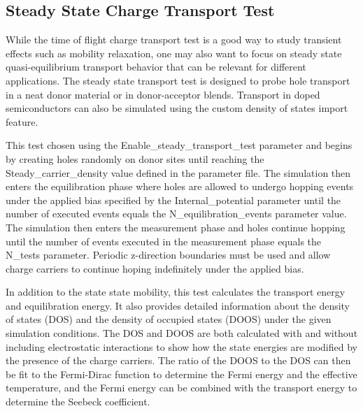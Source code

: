 \documentclass[%
 reprint,onecolumn,notitlepage,
superscriptaddress,longbibliography,
 amsmath,amssymb,
 aps,rmp,floatfix,
]{revtex4-1}
\begin{document}
\subsection{Steady State Charge Transport Test}

While the time of flight charge transport test is a good way to study transient effects such as mobility relaxation, one may also want to focus on steady state quasi-equilibrium transport behavior that can be relevant for different applications.
The steady state transport test is designed to probe hole transport in a neat donor material or in donor-acceptor blends.
Transport in doped semiconductors can also be simulated using the custom density of states import feature.

This test chosen using the Enable\_steady\_transport\_test parameter and begins by creating holes randomly on donor sites until reaching the Steady\_carrier\_density value defined in the parameter file.
The simulation then enters the equilibration phase where holes are allowed to undergo hopping events under the applied bias specified by the Internal\_potential parameter until the number of executed events equals the N\_equilibration\_events parameter value.
The simulation then enters the measurement phase and holes continue hopping until the number of events executed in the measurement phase equals the N\_tests parameter.
Periodic z-direction boundaries must be used and allow charge carriers to continue hoping indefinitely under the applied bias.

In addition to the state state mobility, this test calculates the transport energy and equilibration energy. 
It also provides detailed information about the density of states (DOS) and the density of occupied states (DOOS) under the given simulation conditions.
The DOS and DOOS are both calculated with and without including electrostatic interactions to show how the state energies are modified by the presence of the charge carriers.
The ratio of the DOOS to the DOS can then be fit to the Fermi-Dirac function to determine the Fermi energy and the effective temperature, and the Fermi energy can be combined with the transport energy to determine the Seebeck coefficient.\cite{zuo2019aem}
\end{document}
